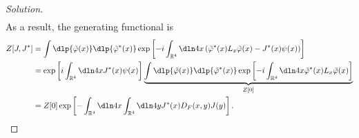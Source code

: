 \begin{proof}[Solution]
\begin{align*}
    \end{align*}
    As a result, the generating functional is
    \begin{align*}
        Z[J, J^*] &= \int \dlp{\tilde{\varphi}(x)} \dlp{\tilde{\varphi}^*(x)} \exp\left[-i \int_{\mathbb{R}^4} \dln4x \left(\tilde{\varphi}^*(x)L_x \tilde{\varphi}(x) - J^*(x) \psi(x)\right)\right]\\
                  &=\exp\left[i\int_{\mathbb{R}^4} \dln4x J^*(x) \psi(x)\right]\underbrace{\int \dlp{\tilde{\varphi}(x)} \dlp{\tilde{\varphi}^*(x)} \exp\left[-i \int_{\mathbb{R}^4} \dln4x \tilde{\varphi}^*(x)L_x \tilde{\varphi}(x) \right]}_{Z[0]}\\
                  &= Z[0] \exp\left[-\int_{\mathbb{R}^4} \dln4x \int_{\mathbb{R}^4} \dln4y J^*(x) D_F(x,y) J(y)\right].
    \end{align*}
    

\end{proof}
